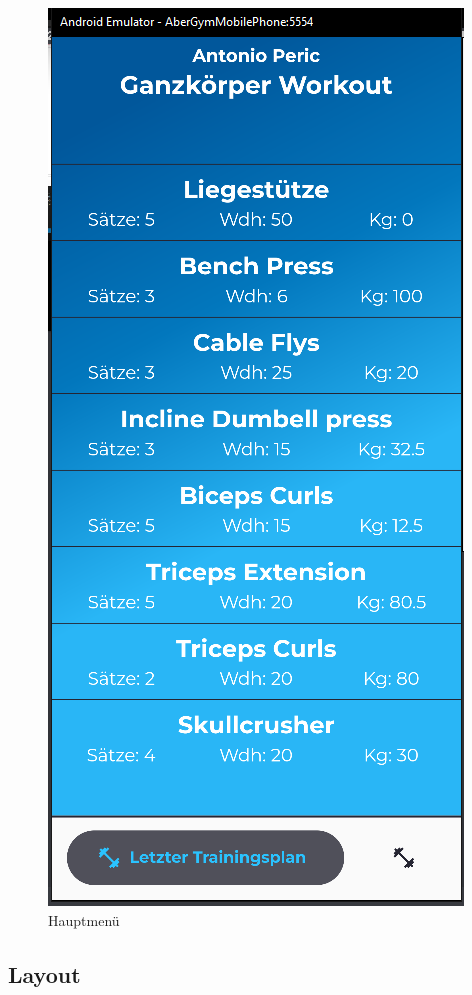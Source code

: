     \begin{figure}[H]
        \centering
        \includegraphics[scale=0.5]{pics/mainmenu.png}
        \caption{Hauptmenü}
    \end{figure}

    \pagebreak
    \subsection{Layout}


